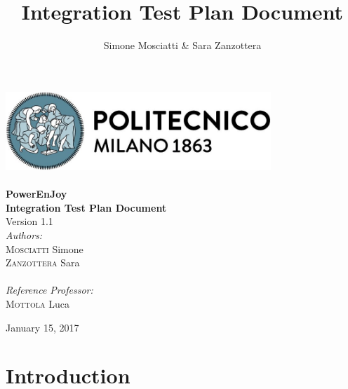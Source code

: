 \documentclass[11pt]{article} %
\title{Integration	Test Plan Document}
\author{Simone Mosciatti \& Sara Zanzottera}
\newcommand{\pe}{PowerEnJoy }
\begin{document}
\begin{titlepage}

\newcommand{\HRule}{\rule{\linewidth}{0.5mm}} %
\center %

\includegraphics[width=10cm]{../DOC/polimiLogoNome.png}\\[0.5cm] %
 


\\[2cm]
{ \Huge \bfseries \pe} \\[0.5cm] %
{ \LARGE \bfseries Integration Test Plan Document} \\[0.5cm]
{\large Version 1.1}
\\[2cm] 

\Large \emph{Authors:}\\
{\Large \textsc{Mosciatti}} Simone\\ %
{\Large \textsc{Zanzottera}} Sara\\
\\[1cm]
\emph{Reference Professor:} \\
{\Large \textsc{Mottola}} Luca %

\vfill %

{\large January 15, 2017}%

\end{titlepage}


\newpage
\tableofcontents
\newpage


\section{Introduction}
\end{document}
